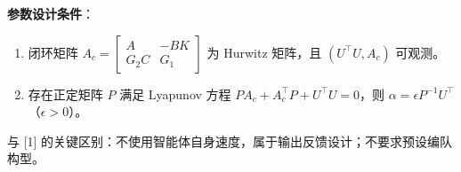 \textbf{参数设计条件}：
\begin{enumerate}
  \item 闭环矩阵 $A_c = \begin{bmatrix} A & -BK \\ G_2C & G_1 \end{bmatrix}$ 为 Hurwitz 矩阵，且 $(U^\top U, A_c)$ 可观测。
  \item 存在正定矩阵 $P$ 满足 Lyapunov 方程 $PA_c + A_c^\top P + U^\top U = 0$，则 $\alpha = \epsilon P^{-1} U^\top$（$\epsilon > 0$）。
\end{enumerate}

与 [1] 的关键区别：不使用智能体自身速度，属于输出反馈设计；不要求预设编队构型。